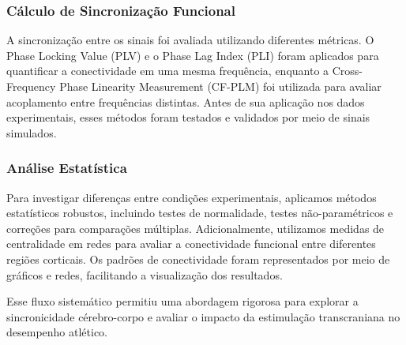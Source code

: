 \subsubsection{Cálculo de Sincronização Funcional}
A sincronização entre os sinais foi avaliada utilizando diferentes métricas. O Phase Locking Value (PLV) e o Phase Lag Index (PLI) foram aplicados para quantificar a conectividade em uma mesma frequência, enquanto a Cross-Frequency Phase Linearity Measurement (CF-PLM) foi utilizada para avaliar acoplamento entre frequências distintas. Antes de sua aplicação nos dados experimentais, esses métodos foram testados e validados por meio de sinais simulados.

\subsubsection{Análise Estatística}
Para investigar diferenças entre condições experimentais, aplicamos métodos estatísticos robustos, incluindo testes de normalidade, testes não-paramétricos e correções para comparações múltiplas. Adicionalmente, utilizamos medidas de centralidade em redes para avaliar a conectividade funcional entre diferentes regiões corticais. Os padrões de conectividade foram representados por meio de gráficos e redes, facilitando a visualização dos resultados.

Esse fluxo sistemático permitiu uma abordagem rigorosa para explorar a sincronicidade cérebro-corpo e avaliar o impacto da estimulação transcraniana no desempenho atlético.
